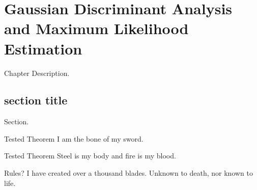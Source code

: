 \chapter{Gaussian Discriminant Analysis and Maximum Likelihood Estimation}
Chapter Description.

\section{section title}
Section.
\begin{ln-theorem}{Tested Theorem}{}
    I am the bone of my sword.
\end{ln-theorem}
\begin{ln-define}{Tested Theorem}{}
    Steel is my body and fire is my blood.
\end{ln-define}
\begin{ln-quest}{Rules?}{}
    I have created over a thousand blades.
    \tcblower
    Unknown to death, nor known to life.
\end{ln-quest}
